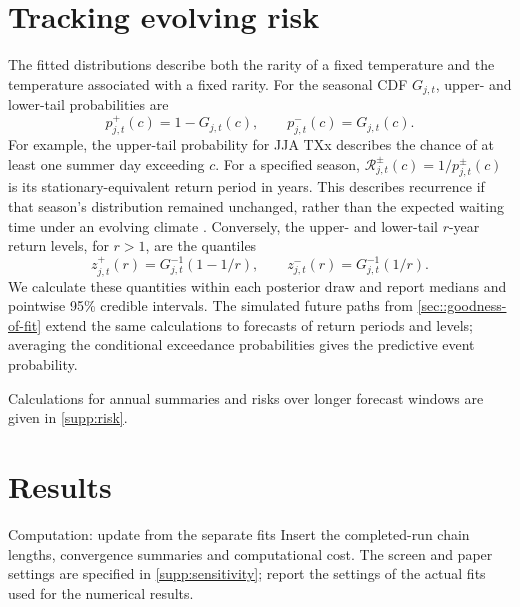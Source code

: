 \documentclass[11pt,a4paper]{article}
\begin{document}
	\section{Tracking evolving risk}\label{sec:tracking-risk}
	
	The fitted distributions describe both the rarity of a fixed
	temperature and the temperature associated with a fixed rarity.
	For the seasonal CDF \(G_{j,t}\), upper- and lower-tail probabilities are
	\begin{equation}\label{eq:threshold-risk}
		p^+_{j,t}(c)=1-G_{j,t}(c),
		\qquad
		p^-_{j,t}(c)=G_{j,t}(c).
	\end{equation}
	For example, the upper-tail probability for JJA TXx describes the
	chance of at least one summer day exceeding \(c\). For a specified
	season, \(\mathcal R^\pm_{j,t}(c)=1/p^\pm_{j,t}(c)\) is its
	stationary-equivalent return period in years. This describes
	recurrence if that season's distribution remained unchanged, rather
	than the expected waiting time under an evolving climate
	\citep{cooley2012,salas2014}. Conversely, the upper- and lower-tail
	\(r\)-year return levels, for \(r>1\), are the quantiles
	\begin{equation}\label{eq:seasonal-return-levels}
		z^+_{j,t}(r)=G_{j,t}^{-1}(1-1/r),
		\qquad
		z^-_{j,t}(r)=G_{j,t}^{-1}(1/r).
	\end{equation}
	We calculate these quantities within each posterior draw and report
	medians and pointwise 95\% credible intervals. The simulated future
	paths from \cref{sec::goodness-of-fit} extend the same calculations
	to forecasts of return periods and levels; averaging the conditional
	exceedance probabilities gives the predictive event probability.
	
	Calculations for annual summaries and risks over longer forecast
	windows are given in \cref{supp:risk}.
	
	\section{Results}\label{sec:results}
	
	\begin{resultbox}{Computation: update from the separate fits}
		Insert the completed-run chain lengths, convergence summaries and
		computational cost. The screen and paper settings are specified in
		\cref{supp:sensitivity}; report the settings of the actual fits used
		for the numerical results.
	\end{resultbox}
	
\end{document}
